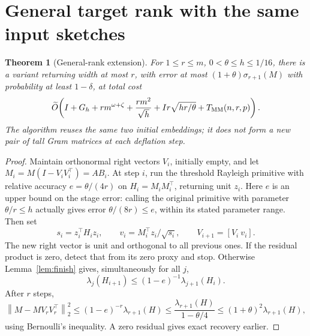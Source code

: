 \documentclass[11pt]{article}
\newtheorem{theorem}{Theorem}
\newcommand{\norm}[1]{\left\lVert#1\right\rVert}
\newcommand{\MM}{T_{\rm MM}}
\newcommand{\tO}{\widetilde O}
\begin{document}
\section{General target rank with the same input sketches}
\begin{theorem}[General-rank extension]\label{thm:rank}
For \(1\leq r\leq m\), \(0<\theta\leq h\leq1/16\), there is a
variant returning width at most \(r\), with error at most
\((1+\theta)\sigma_{r+1}(M)\) with probability at least \(1-\delta\),
at total cost
\[
 \tO\!\left(I+G_h+r m^{\omega+\zeta}
       +\frac{r m^2}{\sqrt h}
       +Ir\sqrt{hr/\theta}+\MM(n,r,p)\right).
\]
The algorithm reuses the same two initial embeddings; it does not form a
new pair of tall Gram matrices at each deflation step.
\end{theorem}
\begin{proof}
Maintain orthonormal right vectors \(V_i\), initially empty, and let
\(M_i=M(I-V_iV_i^\top)=AB_i\). At step \(i\), run the threshold
Rayleigh primitive with relative accuracy \(e=\theta/(4r)\) on
\(H_i=M_iM_i^\top\), returning unit \(z_i\).
Here \(e\) is an upper bound on the stage error: calling the original primitive
with parameter \(\theta/r\leq h\) actually gives error
\(\theta/(8r)\leq e\), within its stated parameter range.
Then set
\[
 s_i=z_i^\top H_i z_i,\qquad
 v_i=M_i^\top z_i/\sqrt{s_i},\qquad
 V_{i+1}=[V_i\ v_i].
\]
The new right vector is unit and orthogonal to all previous ones. If the
residual product is zero, detect that from its zero proxy and stop. Otherwise
Lemma~\ref{lem:finish} gives, simultaneously for all \(j\),
\[
 \lambda_j(H_{i+1})\leq(1-e)^{-1}\lambda_{j+1}(H_i).
\]
After \(r\) steps,
\[
 \norm{M-MV_rV_r^\top}_2^2
 \leq(1-e)^{-r}\lambda_{r+1}(H)
 \leq\frac{\lambda_{r+1}(H)}{1-\theta/4}
 \leq(1+\theta)^2\lambda_{r+1}(H),
\]
using Bernoulli's inequality. A zero residual gives exact recovery earlier.


\end{proof}
\end{document}
